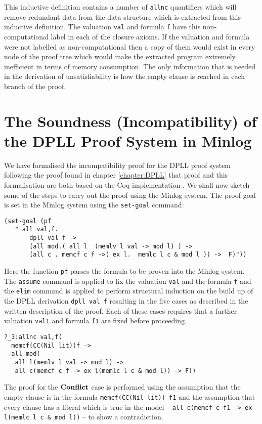 This inductive definition contains a number of \texttt{allnc} quantifiers which will remove redundant data from the data structure which is extracted from this inductive definition. The valuation \texttt{val} and formula \texttt{f} have this non-computational label in each of the closure axioms. If the valuation and formula were not labelled as non-computational then a copy of them would exist in every node of the proof tree which would make the extracted program extremely inefficient in terms of memory consumption. The only information that is needed in the derivation of unsatisfiability is how the empty clause is reached in each branch of the proof.


\section{The Soundness (Incompatibility) of the DPLL Proof System in Minlog}
We have formalised the incompatibility proof for the DPLL proof system following the proof found in chapter \ref{chapter:DPLL} that proof and this formalisation are both based on the Coq implementation \cite{SL08}. We shall now sketch some of the steps to carry out the proof using the Minlog system.
The proof goal is set in the Minlog system using the \texttt{set-goal} command:

\begin{lstlisting}
(set-goal (pf 
   " all val,f.
       dpll val f ->  
       (all mod.( all l  (memlv l val -> mod l) ) -> 
       (all c . memcf c f ->( ex l.  memlc l c & mod l )) ->  F)"))
\end{lstlisting}

Here the function \texttt{pf} parses the formula to be proven into the Minlog system. The \texttt{assume} command is applied to fix the valuation \texttt{val} and the formula \texttt{f} and the \texttt{elim} command is applied to perform structural induction on the build up of the DPLL derivation \texttt{dpll val f} resulting in the five cases as described in the written description of the proof. Each of these cases requires that a further valuation \texttt{val1} and formula \texttt{f1} are fixed before proceeding.

\begin{lstlisting}[caption = "The Conflict Case in Minlog"]
?_3:allnc val,f(
  memcf(CC(Nil lit))f ->
  all mod(
   all l(memlv l val -> mod l) ->
   all c(memcf c f -> ex l(memlc l c & mod l)) -> F))
\end{lstlisting}

The proof for the $\mathbf{Conflict}$ case is performed using the assumption that the empty clause is in the formula \texttt{memcf(CC(Nil lit)) f1} and the assumption that every clause has a literal which is true in the model -- \texttt{all c(memcf c f1 -> ex l(memlc l c \& mod l))} -- to show a contradiction. 


